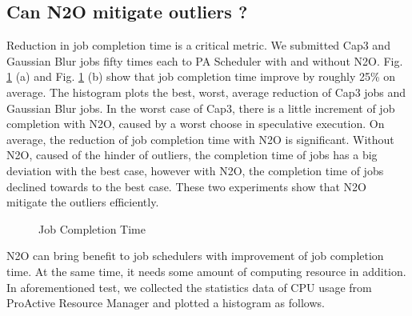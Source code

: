 \subsection{Can N2O mitigate outliers ?}

Reduction in job completion time is a critical metric. We submitted Cap3 and Gaussian Blur jobs fifty times each to PA Scheduler with and without N2O. Fig.  \ref{figure:completiontime} (a) and Fig.  \ref{figure:completiontime} (b) show that job completion time improve by roughly 25\% on average. The histogram plots the best, worst, average reduction of Cap3 jobs and Gaussian Blur jobs. In the worst case of Cap3, there is a little increment of job completion with N2O, caused by a worst choose in speculative execution. On average, the reduction of job completion time with N2O is significant. Without N2O, caused of the hinder of outliers, the completion time of jobs has a big deviation with the best case, however with N2O, the completion time of jobs declined towards to the best case. These two experiments show that N2O mitigate the outliers efficiently.

\begin{figure}
\centering
{}
\caption{Job Completion Time}
\label{figure:completiontime}
\end{figure}

N2O can bring benefit to job schedulers with improvement of job completion time. At the same time, it needs some amount of computing resource in addition. In aforementioned test, we collected the statistics data of CPU usage from ProActive Resource Manager and plotted a histogram as follows.

